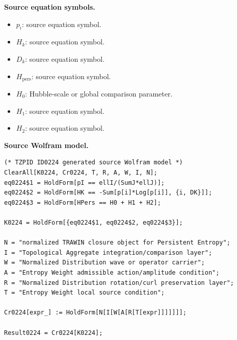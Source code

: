\begin{minipage}[t]{0.49\linewidth}
\begingroup
\small
\raggedright
\textbf{Source equation symbols.}\par
\begin{itemize}[leftmargin=1.35em,itemsep=1pt,topsep=1pt,parsep=0pt]
    \item $p_i$: source equation symbol.
    \item $H_k$: source equation symbol.
    \item $D_k$: source equation symbol.
    \item $H_{\mathrm{pers}}$: source equation symbol.
    \item $H_0$: Hubble-scale or global comparison parameter.
    \item $H_1$: source equation symbol.
    \item $H_2$: source equation symbol.
\end{itemize}
\endgroup
\end{minipage}\hfill
\begin{minipage}[t]{0.47\linewidth}
\begingroup
\scriptsize
\raggedright
\textbf{Source Wolfram model.}\par
\begin{Verbatim}[fontsize=\tiny,breaklines=true,breakanywhere=true]
(* TZPID ID0224 generated source Wolfram model *)
ClearAll[K0224, Cr0224, T, R, A, W, I, N];
eq0224$1 = HoldForm[pI == ellI/(SumJ*ellJ)];
eq0224$2 = HoldForm[HK == -Sum[p[i]*Log[p[i]], {i, DK}]];
eq0224$3 = HoldForm[HPers == H0 + H1 + H2];

K0224 = HoldForm[{eq0224$1, eq0224$2, eq0224$3}];

N = "normalized TRAWIN closure object for Persistent Entropy";
I = "Topological Aggregate integration/comparison layer";
W = "Normalized Distribution wave or operator carrier";
A = "Entropy Weight admissible action/amplitude condition";
R = "Normalized Distribution rotation/curl preservation layer";
T = "Entropy Weight local source condition";

Cr0224[expr_] := HoldForm[N[I[W[A[R[T[expr]]]]]]];

Result0224 = Cr0224[K0224];
\end{Verbatim}
\endgroup
\end{minipage}

